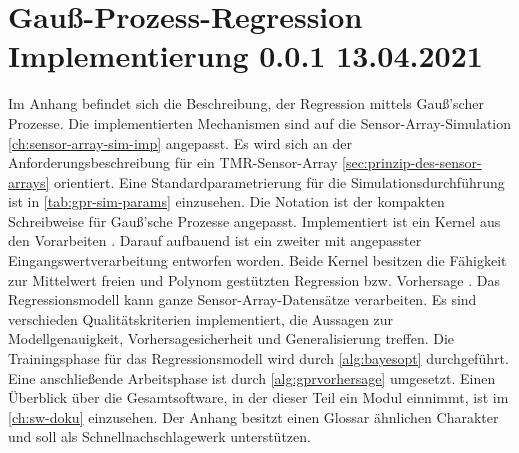 %

\chapter{Gauß-Prozess-Regression Implementierung 0.0.1 13.04.2021}\label{ch:gpr-imp}


Im Anhang befindet sich die Beschreibung, der Regression mittels Gauß'scher Prozesse. Die implementierten Mechanismen sind auf die Sensor-Array-Simulation \autoref{ch:sensor-array-sim-imp} angepasst. Es wird sich  an der Anforderungsbeschreibung für ein TMR-Sensor-Array \autoref{sec:prinzip-des-sensor-arrays} orientiert. Eine Standardparametrierung für die Simulationsdurchführung ist in \autoref{tab:gpr-sim-params} einzusehen. Die Notation ist der kompakten Schreibweise für Gauß'sche Prozesse \cite{Rasmussen2006} angepasst. Implementiert ist ein Kernel aus den Vorarbeiten \cite{Schuethe2020b}\cite{Schuethe2020}. Darauf aufbauend ist ein zweiter mit angepasster Eingangswertverarbeitung entworfen worden. Beide Kernel besitzen die Fähigkeit zur Mittelwert freien und Polynom gestützten Regression bzw. Vorhersage \cite{Rasmussen2006}. Das Regressionsmodell kann ganze Sensor-Array-Datensätze verarbeiten. Es sind verschieden Qualitätskriterien implementiert, die Aussagen zur Modellgenauigkeit, Vorhersagesicherheit und Generalisierung treffen. Die Trainingsphase für das Regressionsmodell wird durch \autoref{alg:bayesopt} durchgeführt. Eine anschließende Arbeitsphase ist durch \autoref{alg:gprvorhersage} umgesetzt. Einen Überblick über die Gesamtsoftware, in der dieser Teil ein Modul einnimmt, ist im \autoref{ch:sw-doku} einzusehen. Der Anhang besitzt einen Glossar ähnlichen Charakter und soll als Schnellnachschlagewerk unterstützen.


